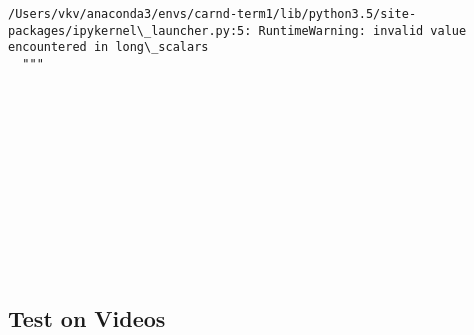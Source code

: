\documentclass[11pt]{article}
\begin{document}
    \begin{Verbatim}[commandchars=\\\{\}]
/Users/vkv/anaconda3/envs/carnd-term1/lib/python3.5/site-packages/ipykernel\_launcher.py:5: RuntimeWarning: invalid value encountered in long\_scalars
  """

    \end{Verbatim}

    \begin{center}
    \end{center}
    { \hspace*{\fill} \\}
    
    \begin{center}
    \end{center}
    { \hspace*{\fill} \\}
    
    \begin{center}
    \end{center}
    { \hspace*{\fill} \\}
    
    \begin{center}
    \end{center}
    { \hspace*{\fill} \\}
    
    \begin{center}
    \end{center}
    { \hspace*{\fill} \\}
    
    \begin{center}
    \end{center}
    { \hspace*{\fill} \\}
    
    \hypertarget{test-on-videos}{%
\subsection{Test on Videos}\label{test-on-videos}}
\end{document}

